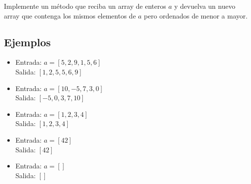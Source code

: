 Implemente un método que reciba un array de enteros \(a\) y devuelva un nuevo array que contenga los mismos elementos de \(a\) pero ordenados de menor a mayor.

\subsection*{Ejemplos}

\begin{itemize}
    \item Entrada: \(a = [5, 2, 9, 1, 5, 6]\)\\
    Salida: \([1, 2, 5, 5, 6, 9]\)

    \item Entrada: \(a = [10, -5, 7, 3, 0]\)\\
    Salida: \([-5, 0, 3, 7, 10]\)

    \item Entrada: \(a = [1, 2, 3, 4]\)\\
    Salida: \([1, 2, 3, 4]\)

    \item Entrada: \(a = [42]\)\\
    Salida: \([42]\)

    \item Entrada: \(a = []\)\\
    Salida: \([]\)
\end{itemize}

